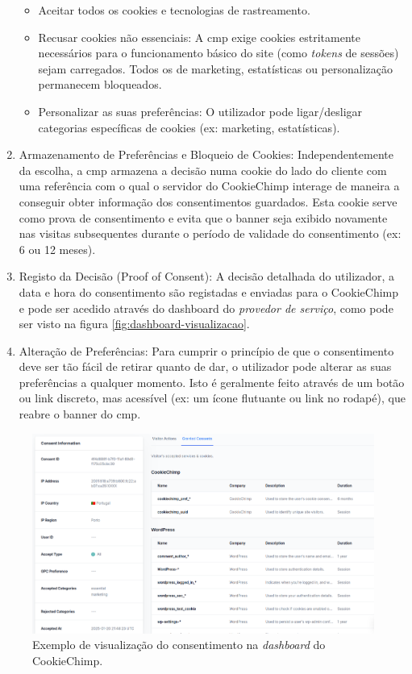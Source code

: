 \begin{enumerate}
    \begin{itemize}
        \item Aceitar todos os cookies e tecnologias de rastreamento.
        \item Recusar cookies não essenciais: A \acrshort{cmp} exige cookies estritamente necessários para o funcionamento básico do site (como \textit{tokens} de sessões) sejam carregados. Todos os de marketing, estatísticas ou personalização permanecem bloqueados.
        \item Personalizar as suas preferências: O utilizador pode ligar/desligar categorias específicas de cookies (ex: marketing, estatísticas).
    \end{itemize}
    \item Armazenamento de Preferências e Bloqueio de Cookies: Independentemente da escolha, a \acrshort{cmp} armazena a decisão numa cookie do lado do cliente com uma referência com o qual o servidor do CookieChimp interage de maneira a conseguir obter informação dos consentimentos guardados. Esta cookie serve como prova de consentimento e evita que o banner seja exibido novamente nas visitas subsequentes durante o período de validade do consentimento (ex: 6 ou 12 meses).
    \item Registo da Decisão (Proof of Consent): A decisão detalhada do utilizador, a data e hora do consentimento são registadas e enviadas para o CookieChimp e pode ser acedido através do dashboard do \textit{provedor de serviço}, como pode ser visto na figura \ref{fig:dashboard-visualizacao}.
    \item Alteração de Preferências: Para cumprir o princípio de que o consentimento deve ser tão fácil de retirar quanto de dar, o utilizador pode alterar as suas preferências a qualquer momento. Isto é geralmente feito através de um botão ou link discreto, mas acessível (ex: um ícone flutuante ou link no rodapé), que reabre o banner do \acrshort{cmp}.
\end{enumerate}


\label{fig:dashboard-visualizacao}
\begin{figure}[h]
    \begin{center}
	\includegraphics[width=1.0\textwidth]{images/consent.png}
    \end{center}
    \caption{Exemplo de visualização do consentimento na \textit{dashboard} do CookieChimp.}
\end{figure}


